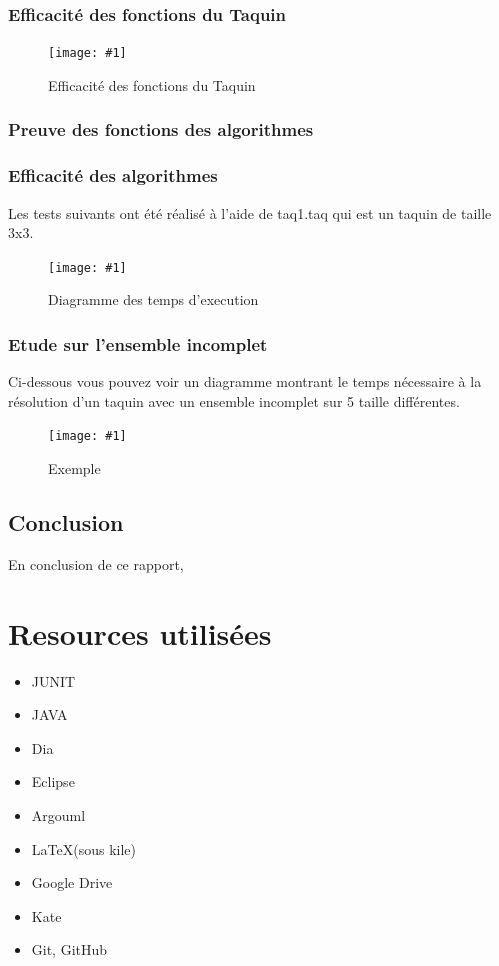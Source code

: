 ﻿\documentclass[a4paper,twoside,12pt]{report}
\newcommand{\monimage}[4]{
\par\noindent
\begin{figure}[H] %
\begin{center}
\texttt{[image: \#1]} %
\caption{#2} %
\label{#3} %
\end{center}
\end{figure} %
}
\begin{document}
\subsection{Efficacité des fonctions du Taquin}
%
\monimage{taquinSpeed.png}{Efficacité des fonctions du Taquin}{Eff}{0.6}
\subsection{Preuve des fonctions des algorithmes}
%
\subsection{Efficacité des algorithmes}
Les tests suivants ont été réalisé à l'aide de taq1.taq qui est un taquin de taille 3x3.
\monimage{algoSpeed.png}{Diagramme des temps d'execution}{tempsExec}{0.6}

\subsection{Etude sur l'ensemble incomplet}
Ci-dessous vous pouvez voir un diagramme montrant le temps nécessaire à la résolution d'un taquin avec un ensemble incomplet sur 5 taille différentes.
\monimage{ensembleincomplettest2.pdf}{Exemple}{EX}{0.6}

\section{Conclusion}
%
En conclusion de ce rapport, 
\chapter{Resources utilisées}
\begin{itemize}
 \item JUNIT
 \item JAVA
 \item Dia
 \item Eclipse
 \item Argouml
 \item \LaTeX (sous kile)
 \item Google Drive
 \item Kate
 \item Git, GitHub
\end{itemize}
\end{document}
